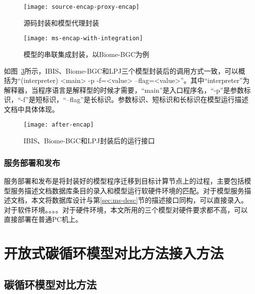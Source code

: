 \begin{figure}[!htbp]
    \centering
    \texttt{[image: source-encap-proxy-encap]}
    \caption{源码封装和模型代理封装}
    \label{fig:source-encap-proxy-encap}
\end{figure}

\begin{figure}[!htbp]
    \centering
    \texttt{[image: ms-encap-with-integration]}
    \caption{模型的串联集成封装，以Biome-BGC为例}
    \label{fig:ms-encap-with-integration}
\end{figure}

如图~\ref{fig:after-encap}所示，IBIS、Biome-BGC和LPJ三个模型封装后的调用方式一致，可以概括为“(interpreter) <main> -p -f=<value> --flag=<value>”。其中“interpreter”为解释器，当程序语言是解释型的时候才需要，“main”是入口程序名，“-p”是参数标识，“-f”是短标识，“--flag”是长标识。参数标识、短标识和长标识在模型运行描述文档中具体体现。

\begin{figure}[!htbp]
    \centering
    \texttt{[image: after-encap]}
    \caption{IBIS、Biome-BGC和LPJ封装后的运行接口}
    \label{fig:after-encap}
\end{figure}


\subsubsection{服务部署和发布}
服务部署和发布是将封装好的模型程序迁移到目标计算节点上的过程，主要包括模型服务描述文档数据库条目的录入和模型运行软硬件环境的匹配。对于模型服务描述文档，本文将数据库设计与第\ref{sec:ms-desc}节的描述接口同构，可以直接录入。对于软件环境。。。。对于硬件环境，本文所用的三个模型对硬件要求都不高，可以直接部署在普通PC机上。

\section{开放式碳循环模型对比方法接入方法}

\subsection{碳循环模型对比方法}
